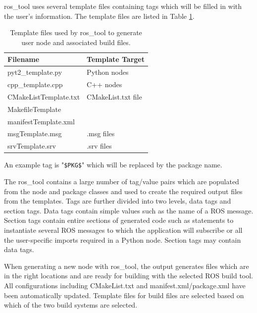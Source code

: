 \documentclass[letterpaper, 10 pt, conference]{ieeeconf}  %
\begin{document}
ros\_tool uses several template files containing tags which will be filled in with the user's information.    The template files are listed in Table \ref{tagtable}.

\begin{table}\centering
\begin{tabular}{ll}
Filename                                 & Template Target \\ \hline
pyt2\_template.py                   &  Python nodes \\
cpp\_template.cpp                   & C++ nodes \\
CMakeListTemplate.txt        &  CMakeList.txt file \\
MakefileTemplate\\
manifestTemplate.xml \\
msgTemplate.msg              & .msg files \\
srvTemplate.srv                & .srv files\\
\end{tabular}
\caption{Template files used by ros\_tool to generate user node and associated build files.}\label{tagtable}
\end{table}

An example tag is "{\tt \$PKG\$}" which will be replaced by the package name.

The ros\_tool contains a large number of tag/value pairs which are populated from the node and package classes and used to create the required output files from the templates.   Tags are further divided into two levels, data tags and section tags.   Data tags contain simple values such as the name of a ROS message.  Section tags contain entire sections of generated code such as statements to instantiate several ROS messages to which the application will subscribe  or all the user-specific imports required in a Python node.  Section tags may contain data tags.

When generating a new node with ros\_tool, the output generates files which are in the right locations and are ready for building with the selected ROS build tool.   All configurations including CMakeList.txt and manifest.xml/package.xml have been automatically updated. Template files for build files are selected based on which of the two build systems are selected.
\end{document}
